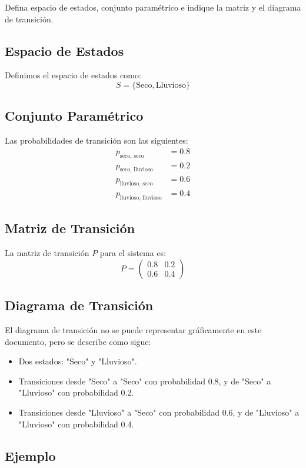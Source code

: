 \documentclass{article}
\begin{document}
Defina espacio de estados, conjunto paramétrico e indique la matriz y el diagrama de transición.


\subsection*{Espacio de Estados}
Definimos el espacio de estados como:
\[ S = \{ \text{Seco}, \text{Lluvioso} \} \]

\subsection*{Conjunto Paramétrico}
Las probabilidades de transición son las siguientes:
\begin{align*}
    p_{\text{seco, seco}}         & = 0.8 \\
    p_{\text{seco, lluvioso}}     & = 0.2 \\
    p_{\text{lluvioso, seco}}     & = 0.6 \\
    p_{\text{lluvioso, lluvioso}} & = 0.4
\end{align*}

\subsection*{Matriz de Transición}
La matriz de transición $P$ para el sistema es:
\[ P = \begin{pmatrix}
        0.8 & 0.2 \\
        0.6 & 0.4
    \end{pmatrix} \]

\subsection*{Diagrama de Transición}
El diagrama de transición no se puede representar gráficamente en este documento, pero se describe como sigue:
\begin{itemize}
    \item Dos estados: "Seco" y "Lluvioso".
    \item Transiciones desde "Seco" a "Seco" con probabilidad 0.8, y de "Seco" a "Lluvioso" con probabilidad 0.2.
    \item Transiciones desde "Lluvioso" a "Seco" con probabilidad 0.6, y de "Lluvioso" a "Lluvioso" con probabilidad 0.4.
\end{itemize}

\subsection{Ejemplo}
\end{document}
